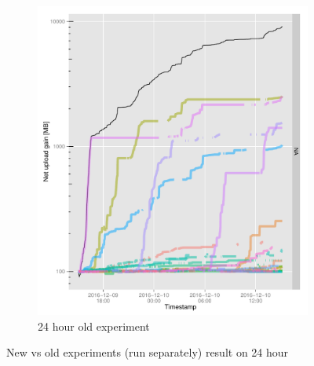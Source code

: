 \begin{figure}[t!]
\begin{adjustwidth}{-2.5cm}{}
\begin{subfigure}[t]{0.7\textwidth}
			\centering
			\includegraphics[width=\textwidth]{pics/results/m138.pdf}
			\caption{24 hour old experiment}
		\end{subfigure}
		\caption{New vs old experiments (run separately) result on 24 hour}
	\end{adjustwidth}
\end{figure}


